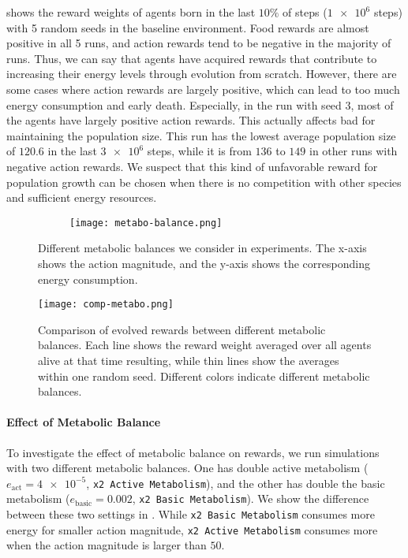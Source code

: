  shows the reward weights of agents born in the last $10\%$ of steps ($\num{1e6}$ steps) with 5 random seeds in the baseline environment. Food rewards are almost positive in all 5 runs, and action rewards tend to be negative in the majority of runs. Thus, we can say that agents have acquired rewards that contribute to increasing their energy levels through evolution from scratch. However, there are some cases where action rewards are largely positive, which can lead to too much energy consumption and early death. Especially, in the run with seed $3$, most of the agents have largely positive action rewards. This actually affects bad for maintaining the population size. This run has the lowest average population size of $120.6$ in the last $\num{3e6}$ steps, while it is from $136$ to $149$ in other runs with negative action rewards. We suspect that this kind of unfavorable reward for population growth can be chosen when there is no competition with other species and sufficient energy resources.

\begin{figure}[t]
  \begin{subfigure}[t]{8cm}
    \centering
    \texttt{[image: metabo-balance.png]}
  \end{subfigure}
  \caption{
    Different metabolic balances we consider in experiments. The x-axis shows the action magnitude, and the y-axis shows the corresponding energy consumption.
  }\label{figure:metabo-balance}
\end{figure}

\begin{figure}[t]
  \centering
  \texttt{[image: comp-metabo.png]}
  \caption{
    Comparison of evolved rewards between different metabolic balances.
    Each line shows the reward weight averaged over all agents alive at that time resulting, while thin lines show the averages within one random seed.
    Different colors indicate different metabolic balances.
  }\label{figure:result-metabolism}
\end{figure}

\paragraph{Effect of Metabolic Balance}
To investigate the effect of metabolic balance on rewards, we run simulations with two different metabolic balances. One has double active metabolism ($e_{\mathrm{act}} = \num{4e-5}$, \texttt{x2 Active Metabolism}), and the other has double the basic metabolism ($e_{\mathrm{basic}} = 0.002$, \texttt{x2 Basic Metabolism}). We show the difference between these two settings in . While \texttt{x2 Basic Metabolism} consumes more energy for smaller action magnitude, \texttt{x2 Active Metabolism} consumes more when the action magnitude is larger than $50$.



